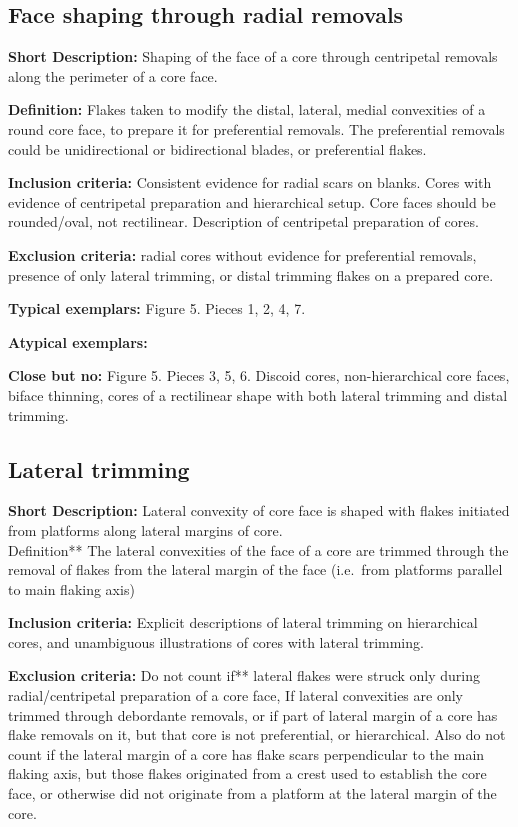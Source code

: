 \documentclass[
]{article}
\begin{document}
\hypertarget{face-shaping-through-radial-removals}{%
\subsection{Face shaping through radial
removals}\label{face-shaping-through-radial-removals}}

\textbf{Short Description:} Shaping of the face of a core through
centripetal removals along the perimeter of a core face.

\textbf{Definition:} Flakes taken to modify the distal, lateral, medial
convexities of a round core face, to prepare it for preferential
removals. The preferential removals could be unidirectional or
bidirectional blades, or preferential flakes.

\textbf{Inclusion criteria:} Consistent evidence for radial scars on
blanks. Cores with evidence of centripetal preparation and hierarchical
setup. Core faces should be rounded/oval, not rectilinear. Description
of centripetal preparation of cores.

\textbf{Exclusion criteria:} radial cores without evidence for
preferential removals, presence of only lateral trimming, or distal
trimming flakes on a prepared core.

\textbf{Typical exemplars:} Figure 5. Pieces 1, 2, 4, 7.

\textbf{Atypical exemplars:}

\textbf{Close but no:} Figure 5. Pieces 3, 5, 6. Discoid cores,
non-hierarchical core faces, biface thinning, cores of a rectilinear
shape with both lateral trimming and distal trimming.

\hypertarget{lateral-trimming}{%
\subsection{Lateral trimming}\label{lateral-trimming}}

\textbf{Short Description:} Lateral convexity of core face is shaped
with flakes initiated from platforms along lateral margins of core.\\
Definition** The lateral convexities of the face of a core are trimmed
through the removal of flakes from the lateral margin of the face
(i.e.~from platforms parallel to main flaking axis)

\textbf{Inclusion criteria:} Explicit descriptions of lateral trimming
on hierarchical cores, and unambiguous illustrations of cores with
lateral trimming.

\textbf{Exclusion criteria:} Do not count if** lateral flakes were
struck only during radial/centripetal preparation of a core face, If
lateral convexities are only trimmed through debordante removals, or if
part of lateral margin of a core has flake removals on it, but that core
is not preferential, or hierarchical. Also do not count if the lateral
margin of a core has flake scars perpendicular to the main flaking axis,
but those flakes originated from a crest used to establish the core
face, or otherwise did not originate from a platform at the lateral
margin of the core.
\end{document}
